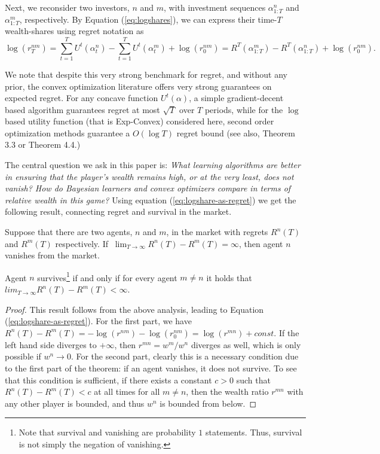 Next, we reconsider two investors, $n$ and $m$, with  investment sequences $\alpha_{1:T}^n$ and $\alpha_{1:T}^m$, respectively. By Equation (\ref{eq:logshares}), we can express their time-$T$ wealth-shares using regret notation as
 \begin{equation}
 \label{eq:logshare-as-regret}
	\log(r^{nm}_{T})   = \sum_{t=1}^{T} U^t(\alpha^n_t)-\sum_{t=1}^{T} U^t(\alpha^m_t) + \log(r^{nm}_{0})=R^T(\alpha_{1:T}^m)-R^T(\alpha_{1:T}^n)+\log(r^{nm}_{0}).
\end{equation}

We note that despite this very strong benchmark for regret, and without any prior, the convex optimization literature offers very strong guarantees on expected regret. For any concave function $U^t(\alpha)$, a simple gradient-decent based algorithm guarantees regret at most $\sqrt{T}$ over $T$ periods, while for the $\log$ based utility function (that is Exp-Convex) considered here, second order optimization methods guarantee a $O(\log T)$ regret bound  \cite{DBLP:journals/ml/BlumK99} (see also, \cite{cesa2006prediction} Theorem 3.3 or \cite{hazan2016introduction} Theorem 4.4.)

The central question we ask in this paper is:  
{\em
What learning algorithms are better in ensuring that the player's wealth remains high, or at the very least, does not vanish? How do Bayesian learners and convex optimizers compare in terms of relative wealth in this game? 
}
Using equation (\ref{eq:logshare-as-regret}) we get the following result, connecting regret and survival in the market.

\begin{theorem}\label{thm:survival-by-finite-regret-gap}
    Suppose that there are two agents, $n$ and $m$, in the market with regrets $R^n(T)$  and $R^m(T)$ respectively. If $ \ \lim_{T \rightarrow \infty} R^n(T) - R^m(T) = \infty$, then agent $n$ vanishes from the market. 
    
    Agent $n$ survives\footnote{Note that survival and vanishing are probability $1$ statements. Thus, survival is not simply the negation of vanishing.} if and only if for every agent $m \neq n$ it holds that $lim_{T \rightarrow \infty} R^n(T) - R^m(T) < \infty$.
\end{theorem}

\begin{proof}
 This result follows from the above analysis, leading to Equation (\ref{eq:logshare-as-regret}). For the first part, we have $R^n(T) - R^m(T) = -\log(r^{nm}) - \log(r_0^{nm}) = \log(r^{mn}) + const$. If the left hand side diverges to $+\infty$, then $r^{mn} = w^m/w^n$ diverges as well, which is only possible if $w^n \rightarrow 0$. For the second part, clearly this is a necessary condition due to the first part of the theorem: if an agent vanishes, it does not survive. To see that this condition is sufficient, if there exists a constant $c > 0$ such that $R^n(T) - R^m(T) < c$ at all times for all $m \neq n$, then the wealth ratio $r^{mn}$ with any other player is bounded, and thus $w^n$ is bounded from below. 
\end{proof}

